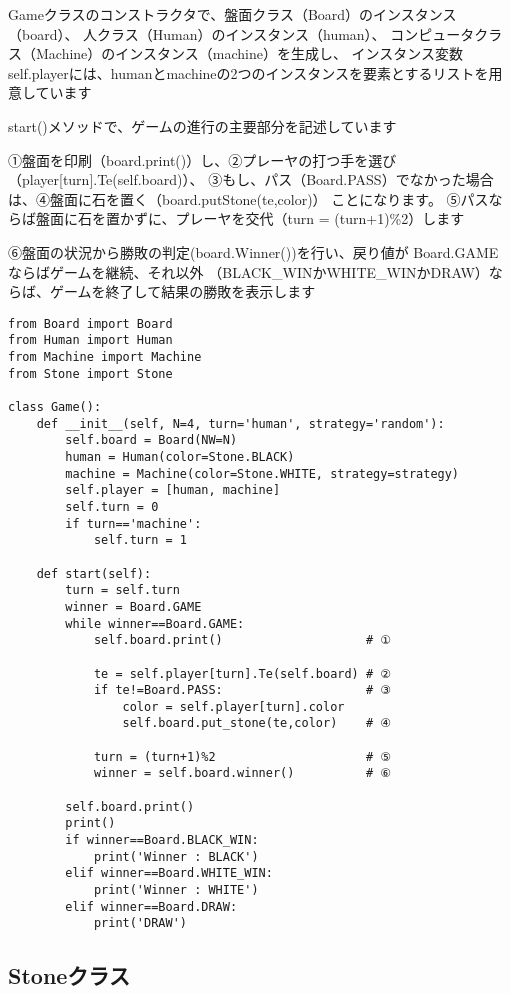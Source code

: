 \documentclass[uplatex,a4paper,11pt,oneside,openany]{jsbook}
\begin{document}
Gameクラスのコンストラクタで、盤面クラス（Board）のインスタンス（board）、
人クラス（Human）のインスタンス（human）、
コンピュータクラス（Machine）のインスタンス（machine）を生成し、
インスタンス変数self.playerには、humanとmachineの2つのインスタンスを要素とするリストを用意しています

start()メソッドで、ゲームの進行の主要部分を記述しています

①盤面を印刷（board.print()）し、②プレーヤの打つ手を選び（player[turn].Te(self.board)）、
③もし、パス（Board.PASS）でなかった場合は、④盤面に石を置く（board.putStone(te,color)）
ことになります。
⑤パスならば盤面に石を置かずに、プレーヤを交代（turn = (turn+1)\%2）します

⑥盤面の状況から勝敗の判定(board.Winner())を行い、戻り値が
Board.GAMEならばゲームを継続、それ以外
（BLACK\_WINかWHITE\_WINかDRAW）ならば、ゲームを終了して結果の勝敗を表示します

\begin{lstlisting}[caption=Game class,label=othello01]
from Board import Board
from Human import Human
from Machine import Machine
from Stone import Stone

class Game():
    def __init__(self, N=4, turn='human', strategy='random'):
        self.board = Board(NW=N)
        human = Human(color=Stone.BLACK)
        machine = Machine(color=Stone.WHITE, strategy=strategy)
        self.player = [human, machine]
        self.turn = 0
        if turn=='machine':
            self.turn = 1

    def start(self):
        turn = self.turn
        winner = Board.GAME
        while winner==Board.GAME:
            self.board.print()                    # ①

            te = self.player[turn].Te(self.board) # ②
            if te!=Board.PASS:                    # ③
                color = self.player[turn].color
                self.board.put_stone(te,color)    # ④

            turn = (turn+1)%2                     # ⑤
            winner = self.board.winner()          # ⑥

        self.board.print()
        print()
        if winner==Board.BLACK_WIN:
            print('Winner : BLACK')
        elif winner==Board.WHITE_WIN:
            print('Winner : WHITE')
        elif winner==Board.DRAW:
            print('DRAW')
\end{lstlisting}

\subsection{Stoneクラス}
\end{document}
